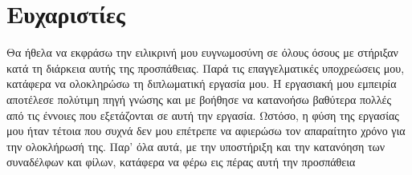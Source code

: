 \chapter*{Ευχαριστίες}

Θα ήθελα να εκφράσω την ειλικρινή μου ευγνωμοσύνη 
σε όλους όσους με στήριξαν κατά τη διάρκεια αυτής 
της προσπάθειας. Παρά τις επαγγελματικές υποχρεώσεις 
μου, κατάφερα να ολοκληρώσω τη διπλωματική εργασία 
μου. Η εργασιακή μου εμπειρία αποτέλεσε πολύτιμη 
πηγή γνώσης και με βοήθησε να κατανοήσω βαθύτερα 
πολλές από τις έννοιες που εξετάζονται σε αυτή την 
εργασία. Ωστόσο, η φύση της εργασίας μου ήταν τέτοια 
που συχνά δεν μου επέτρεπε να αφιερώσω τον απαραίτητο
 χρόνο για την ολοκλήρωσή της. Παρ' όλα αυτά, με την 
υποστήριξη και την κατανόηση των συναδέλφων και φίλων, 
κατάφερα να φέρω εις πέρας αυτή την προσπάθεια